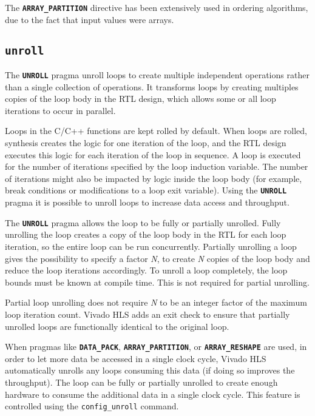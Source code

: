 The \texttt{\textbf{ARRAY\_PARTITION}} directive has been extensively used in ordering algorithms, due to the fact that input values were arrays.

\subsection{\texttt{\textbf{unroll}}}

The \texttt{\textbf{UNROLL}} pragma unroll loops to create multiple independent operations rather than a single collection of operations. It transforms loops by creating multiples copies of the loop body in the RTL design, which allows some or all loop iterations to occur in parallel.

Loops in the C/C++ functions are kept rolled by default. When loops are rolled, synthesis creates the logic for one iteration of the loop, and the RTL design executes this logic for each iteration of the loop in sequence. A loop is executed for the number of iterations specified by the loop induction variable. The number of iterations might also be impacted by logic inside the loop body (for example, break conditions or modifications to a loop exit variable). Using the \texttt{\textbf{UNROLL}} pragma it is possible to unroll loops to increase data access and throughput.

The \texttt{\textbf{UNROLL}} pragma allows the loop to be fully or partially unrolled. Fully unrolling the loop creates a copy of the loop body in the RTL for each loop iteration, so the entire loop can be run concurrently. Partially unrolling a loop gives the possibility to specify a factor \textit{N}, to create \textit{N} copies of the loop body and reduce the loop iterations accordingly. To unroll a loop completely, the loop bounds must be known at compile time. This is not required for partial unrolling.

Partial loop unrolling does not require \textit{N} to be an integer factor of the maximum loop iteration count. Vivado HLS adds an exit check to ensure that partially unrolled loops are functionally identical to the original loop.

When pragmas like \texttt{\textbf{DATA\_PACK}}, \texttt{\textbf{ARRAY\_PARTITION}}, or \texttt{\textbf{ARRAY\_RESHAPE}} are used, in order to let more data be accessed in a single clock cycle, Vivado HLS automatically unrolls any loops consuming this data (if doing so improves the throughput). The loop can be fully or partially unrolled to create enough hardware to consume the additional data in a single clock cycle. This feature is controlled using the \texttt{config\_unroll} command.

